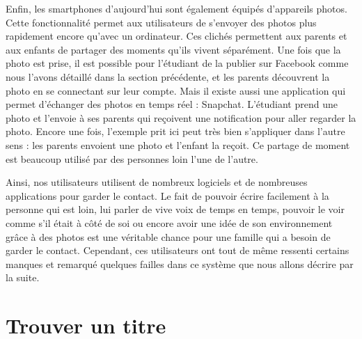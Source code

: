 \documentclass[12pt]{article}
\begin{document}
Enfin, les smartphones d'aujourd'hui sont également équipés d'appareils photos. Cette fonctionnalité permet aux utilisateurs de s'envoyer des photos plus rapidement encore qu'avec un ordinateur. Ces clichés permettent aux parents et aux enfants de partager des moments qu'ils vivent séparément. Une fois que la photo est prise, il est possible pour l'étudiant de la publier sur Facebook comme nous l'avons détaillé dans la section précédente, et les parents découvrent la photo en se connectant sur leur compte. Mais il existe aussi une application qui permet d'échanger des photos en temps réel : Snapchat. L'étudiant prend une photo et l'envoie à ses parents qui reçoivent une notification pour aller regarder la photo. Encore une fois, l'exemple prit ici peut très bien s'appliquer dans l'autre sens : les parents envoient une photo et l'enfant la reçoit. Ce partage de moment est beaucoup utilisé par des personnes loin l'une de l'autre. 

Ainsi, nos utilisateurs utilisent de nombreux logiciels et de nombreuses applications pour garder le contact. Le fait de pouvoir écrire facilement à la personne qui est loin, lui parler de vive voix de temps en temps, pouvoir le voir comme s'il était à côté de soi ou encore avoir une idée de son environnement grâce à des photos est une véritable chance pour une famille qui a besoin de garder le contact. Cependant, ces utilisateurs ont tout de même ressenti certains manques et remarqué quelques failles dans ce système que nous allons décrire par la suite.


\section{Trouver un titre}
\end{document}
